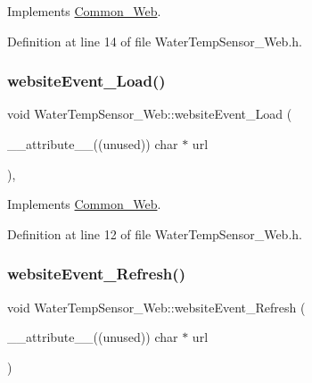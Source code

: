 Implements \hyperlink{class_common___web_a898e3fd8cc6384ecbbbd79c8a3a13b62}{Common\+\_\+\+Web}.



Definition at line 14 of file Water\+Temp\+Sensor\+\_\+\+Web.\+h.

\mbox{\label{class_water_temp_sensor___web_a89df0a40b5304ee5dc164bf89a6198e9}} 
\subsubsection{\texorpdfstring{website\+Event\+\_\+\+Load()}{websiteEvent\_Load()}}
{\footnotesize\ttfamily void Water\+Temp\+Sensor\+\_\+\+Web\+::website\+Event\+\_\+\+Load (\begin{DoxyParamCaption}\item[{\+\_\+\+\_\+attribute\+\_\+\+\_\+((unused)) char $\ast$}]{url }\end{DoxyParamCaption})\hspace{0.3cm}{\ttfamily [inline]}, {\ttfamily [virtual]}}



Implements \hyperlink{class_common___web_a5ce0d5ce6f63279c3b624371d8a76211}{Common\+\_\+\+Web}.



Definition at line 12 of file Water\+Temp\+Sensor\+\_\+\+Web.\+h.

\mbox{\label{class_water_temp_sensor___web_a930d46ab1e337e085a06058d8c07f76b}} 
\subsubsection{\texorpdfstring{website\+Event\+\_\+\+Refresh()}{websiteEvent\_Refresh()}}
{\footnotesize\ttfamily void Water\+Temp\+Sensor\+\_\+\+Web\+::website\+Event\+\_\+\+Refresh (\begin{DoxyParamCaption}\item[{\+\_\+\+\_\+attribute\+\_\+\+\_\+((unused)) char $\ast$}]{url }\end{DoxyParamCaption})\hspace{0.3cm}{\ttfamily [virtual]}}



